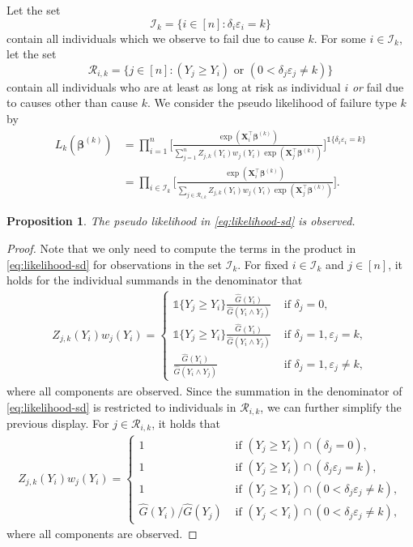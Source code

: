\documentclass[11pt]{article}
\newcommand{\X}{\mathbf{X}}
\renewcommand{\b}{\bm{\beta}}
\newcommand{\indic}{\mathds{1}}
\newtheorem{proposition}[theorem]{Proposition}
\begin{document}
Let the set 
\[
	\mathcal{I}_{k} = \{i \in [n] : \delta_i\varepsilon_i = k\}
\] 
contain all individuals which we observe to fail due to cause $k$. For some $i\in\mathcal{I}_k,$ let the set 
\[
\mathcal{R}_{i,k} = \{j \in[n] : (Y_j \geq Y_i) \text{ or } (0 < \delta_j \varepsilon_j \neq k)\}
\]
contain all individuals who are at least as long at risk as individual $i$ \textit{or} fail due to causes other than cause $k$. We consider the pseudo likelihood of failure type $k$ by
\begin{equation} \label{eq:likelihood-sd}
	\begin{split}
	L_k\left(\b^{(k)}\right)
	&=
	\prod_{i=1}^n
	\Bigg[
		\frac{ \exp(\X_i^\top \b^{(k)}) }{\sum_{j=1}^n Z_{j,k}(Y_i) w_j(Y_i) \exp(\X_j^\top \b^{(k)}) }
	\Bigg]^{\indic\{ \delta_i\varepsilon_i = k \}}
	\\ &=
	\prod_{i\in\mathcal{I}_k}
	\Bigg[
		\frac{ \exp(\X_i^\top \b^{(k)}) }{\sum_{j\in\mathcal{R}_{i,k}} Z_{j,k}(Y_i) w_j(Y_i) \exp(\X_j^\top \b^{(k)}) }
	\Bigg].
	\end{split}
\end{equation}
\begin{proposition}
	The pseudo likelihood in \eqref{eq:likelihood-sd} is observed.
\end{proposition}
\begin{proof}
	Note that we only need to compute the terms in the product in \eqref{eq:likelihood-sd}  for observations in the set $\mathcal{I}_k$. For fixed $i\in\mathcal{I}_k$ and $j\in[n]$, it holds for the individual summands in the denominator that
\begin{align*}
	Z_{j,k}(Y_i) w_j(Y_i)
	=
	\begin{cases}
		\indic \{ Y_j \geq Y_i \} \frac{\widehat{G}(Y_i)}{\widehat{G}(Y_i \wedge Y_j)}  &\text{ if } \delta_j = 0,
		\\
		\indic \{ Y_j \geq Y_i \} \frac{\widehat{G}(Y_i)}{\widehat{G}(Y_i \wedge Y_j)}  &\text{ if } \delta_j = 1, \varepsilon_j = k,
		\\
		\frac{\widehat{G}(Y_i)}{\widehat{G}(Y_i \wedge Y_j)}  &\text{ if } \delta_j = 1, \varepsilon_j \neq k,	
		\end{cases}
\end{align*}	
where all components are observed. Since the summation in the denominator of \eqref{eq:likelihood-sd} is restricted to individuals in $\mathcal{R}_{i,k}$, we can further simplify the previous display. For $j \in \mathcal{R}_{i,k}$, it holds that 
\begin{align*}
	Z_{j,k}(Y_i) w_j(Y_i)
	=
	\begin{cases}
		1  &\text{ if } (Y_j \geq Y_i) \cap (\delta_j = 0),
		\\
		1 &\text{ if } (Y_j \geq Y_i) \cap (\delta_j\varepsilon_j = k),
		\\
		1 &\text{ if } (Y_j \geq Y_i) \cap (0 < \delta_j \varepsilon_j \neq k),
		\\
		\widehat{G}(Y_i) / \widehat{G}(Y_j) &\text{ if } (Y_j < Y_i) \cap (0 < \delta_j \varepsilon_j \neq k),
		\end{cases}
\end{align*}	
where all components are observed. 
\end{proof}
\end{document}
